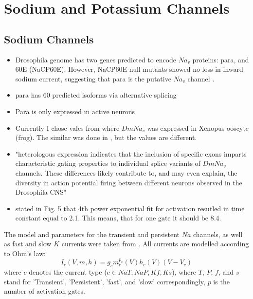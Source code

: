 \documentclass[../../workflow.tex]{subfiles}
\begin{document}
\section{Sodium and Potassium Channels}

\subsection{Sodium Channels}

\begin{itemize}
    \item Drosophila genome has two genes predicted to encode $Na_v$ proteins: para, and
    60E (NaCP60E). However, NaCP60E null mutants showed no loss in inward sodium current,
    suggesting that para is the putative $Na_v$ channel \parencite{ravenscroftDrosophilaVoltageGatedSodium2020}.
    \item para has 60 predicted isoforms via alternative splicing \parencite{ravenscroftDrosophilaVoltageGatedSodium2020}
    \item Para is only expressed in active neurons \parencite{ravenscroftDrosophilaVoltageGatedSodium2020}
    \item Currently I chose vales from \parencite{warmkeFunctionalExpressionDrosophila1997} where
    $DmNa_v$ was expressed in Xenopus ooscyte (frog). The similar was done in
    \parencite{linAlternativeSplicingVoltageGated2009}, but the values are different.
    \item "heterologous expression indicates that the inclusion of specific exons imparts
    characteristic gating properties to individual splice variants of $DmNa_v$ channels.
    These differences likely contribute to, and may even explain, the diversity in action
    potential firing between different neurons observed in the Drosophila CNS"
    \item \parencite{ravenscroftDrosophilaVoltageGatedSodium2020} stated in Fig. 5 that
    4th power exponential fit for activation resutled in time constant equal to 2.1.
    This means, that for one gate it should be 8.4.
\end{itemize}


The model and parameters for the transient and persistent $Na$ channels,
as well as fast and slow $K$ currents were taken from
\parencite{gunayDistalSpikeInitiation2015}. All currents are modelled according to Ohm's law:
\begin{equation*}
    I_{c}(V,m,h) = g_{c} m_{c}^{p_c}(V) h_{c}(V) (V - V_{c})
\end{equation*}
where $c$ denotes the current type ($c \in {NaT,NaP,Kf,Ks}$), where $T$, $P$, $f$, and $s$
stand for 'Transient', 'Persistent', 'fast', and 'slow' correspondingly, $p$ is the number of activation gates.
\end{document}

